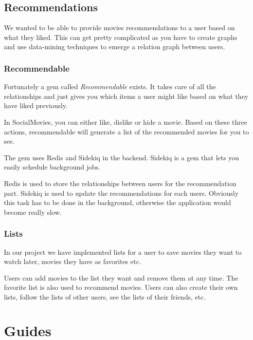 \documentclass[12pt,a4paper]{article}
\begin{document}
\subsection{Recommendations}
We wanted to be able to provide movies recommendations to a user based on what they liked. This can get pretty complicated as you have to create graphs and use data-mining techniques to emerge a relation graph between users.

\subsubsection{Recommendable}
Fortunately a gem called \textit{Recommendable} exists. It takes care of all the relationships and just gives you which items a user might like based on what they have liked previously.

In SocialMovies, you can either like, dislike or hide a movie. Based on these three actions, recommendable will generate a list of the recommended movies for you to see.

The gem uses Redis and Sidekiq in the backend. Sidekiq is a gem that lets you easily schedule background jobs.

Redis is used to store the relationships between users for the recommendation part. Sidekiq is used to update the recommendations for each users. Obviously this task has to be done in the background, otherwise the application would become really slow.

\subsubsection{Lists}
In our project we have implemented lists for a user to save movies they want to watch later, movies they have as favorites etc.

Users can add movies to the list they want and remove them at any time. The favorite list is also used to recommend movies. Users can also create their own lists, follow the lists of other users, see the lists of their friends, etc.

\section{Guides}\label{install}
\end{document}
